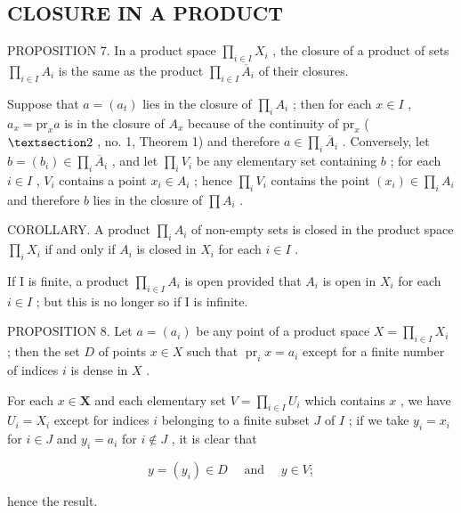 \subsection{CLOSURE IN A PRODUCT}

PROPOSITION 7. In a product space \(\prod_{i\in I}X_i\) , the closure of a product of sets \(\prod_{i\in I}A_i\) is the same as the product \(\prod_{i\in I}\overline{A}_i\) of their closures.

Suppose that \(a = (a_{t})\) lies in the closure of \(\prod_{i} A_{i}\) ; then for each \(x \in I\) , \(a_{x} = \text{pr}_{x} a\) is in the closure of \(A_{x}\) because of the continuity of \(\text{pr}_{x}\) ( \(\S 2\) , no. 1, Theorem 1) and therefore \(a \in \prod_{i} \overline{A}_{i}\) . Conversely, let \(b = (b_{i}) \in \prod_{i} \overline{A}_{i}\) , and let \(\prod_{i} V_{i}\) be any elementary set containing \(b\) ; for each \(i \in I\) , \(V_{i}\) contains a point \(x_{i} \in A_{i}\) ; hence \(\prod_{i} V_{i}\) contains the point \((x_{i}) \in \prod_{i} A_{i}\) and therefore \(b\) lies in the closure of \(\prod A_{i}\) .

COROLLARY. A product \(\prod_{i} A_{i}\) of non-empty sets is closed in the product space \(\prod_{i} X_{i}\) if and only if \(A_{i}\) is closed in \(X_{i}\) for each \(i \in I\) .

If I is finite, a product \(\prod_{i\in I}A_i\) is open provided that \(A_i\) is open in \(X_i\) for each \(i\in I\) ; but this is no longer so if I is infinite.

PROPOSITION 8. Let \(a = (a_{i})\) be any point of a product space \(X = \prod_{i \in I} X_{i}\) ; then the set \(D\) of points \(x \in X\) such that \(\operatorname{pr}_{i} x = a_{i}\) except for a finite number of indices \(i\) is dense in \(X\) .

For each \(x \in \mathbf{X}\) and each elementary set \(V = \prod_{i \in I} U_i\) which contains \(x\) , we have \(U_i = X_i\) except for indices \(i\) belonging to a finite subset \(J\) of \(I\) ; if we take \(y_i = x_i\) for \(i \in J\) and \(y_i = a_i\) for \(i \notin J\) , it is clear that

\[
y = (y _ {i}) \in D \quad \text { and } \quad y \in V;
\]

hence the result.

